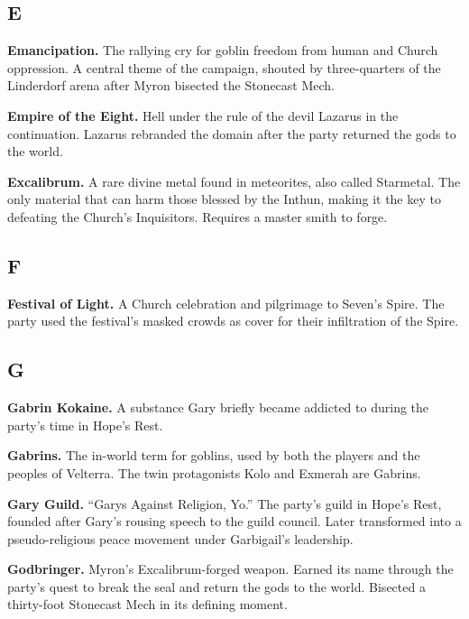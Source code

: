 \subsection*{E}

\noindent
\textbf{Emancipation.} The rallying cry for goblin freedom from human and Church oppression. A central theme of the campaign, shouted by three-quarters of the Linderdorf arena after Myron bisected the Stonecast Mech.

\smallskip \noindent
\textbf{Empire of the Eight.} Hell under the rule of the devil Lazarus in the continuation. Lazarus rebranded the domain after the party returned the gods to the world.

\smallskip \noindent
\textbf{Excalibrum.} A rare divine metal found in meteorites, also called Starmetal. The only material that can harm those blessed by the Inthun, making it the key to defeating the Church's Inquisitors. Requires a master smith to forge.

\subsection*{F}

\noindent
\textbf{Festival of Light.} A Church celebration and pilgrimage to Seven's Spire. The party used the festival's masked crowds as cover for their infiltration of the Spire.

\subsection*{G}

\noindent
\textbf{Gabrin Kokaine.} A substance Gary briefly became addicted to during the party's time in Hope's Rest.

\smallskip \noindent
\textbf{Gabrins.} The in-world term for goblins, used by both the players and the peoples of Velterra. The twin protagonists Kolo and Exmerah are Gabrins.

\smallskip \noindent
\textbf{Gary Guild.} ``Garys Against Religion, Yo.'' The party's guild in Hope's Rest, founded after Gary's rousing speech to the guild council. Later transformed into a pseudo-religious peace movement under Garbigail's leadership.

\smallskip \noindent
\textbf{Godbringer.} Myron's Excalibrum-forged weapon. Earned its name through the party's quest to break the seal and return the gods to the world. Bisected a thirty-foot Stonecast Mech in its defining moment.

